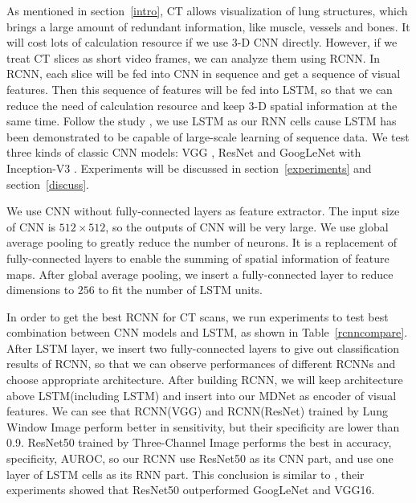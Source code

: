 \documentclass[journal]{IEEEtran}
\begin{document}
As mentioned in section~\ref{intro}, CT allows visualization of lung structures, which brings a large amount of redundant information, like muscle, vessels and bones. It will cost lots of calculation resource if we use 3-D CNN directly. However, if we treat CT slices as short video frames, we can analyze them using RCNN. In RCNN, each slice will be fed into CNN in sequence and get a sequence of visual features. Then this sequence of features will be fed into LSTM, so that we can reduce the need of calculation resource and keep 3-D spatial information at the same time. 
Follow the study \cite{Donahue2015Long}, we use LSTM as our RNN cells cause LSTM has been demonstrated to be capable of large-scale learning of sequence data. We test three kinds of classic CNN models: VGG \cite{simonyan2015very}, ResNet \cite{he2016deep} and GoogLeNet with Inception-V3 \cite{szegedy2016rethinking}. Experiments will be discussed in section~\ref{experiments} and section~\ref{discuss}.

We use CNN without fully-connected layers as feature extractor. The input size of CNN is $512 \times 512$, so the outputs of CNN will be very large. We use global average pooling \cite{lin2014network} to greatly reduce the number of neurons. It is a replacement of fully-connected layers to enable the summing of spatial information of feature maps. After global average pooling, we insert a fully-connected layer to reduce dimensions to $256$ to fit the number of LSTM units.

In order to get the best RCNN for CT scans, we run experiments to test best combination between CNN models and LSTM, as shown in Table~\ref{rcnncompare}. 
After LSTM layer, we insert two fully-connected layers to give out classification results of RCNN, so that we can observe performances of different RCNNs and choose appropriate architecture. After building RCNN, we will keep architecture above LSTM(including LSTM) and insert into our MDNet as encoder of visual features.
We can see that RCNN(VGG) and RCNN(ResNet) trained by Lung Window Image perform better in sensitivity, but their specificity are lower than 0.9. ResNet50 trained by Three-Channel Image performs the best in accuracy, specificity, AUROC, so our RCNN use ResNet50 as its CNN part, and use one layer of LSTM cells as its RNN part. 
This conclusion is similar to \cite{Wang2017ChestX}, their experiments showed that ResNet50 outperformed GoogLeNet and VGG16.
\end{document}
